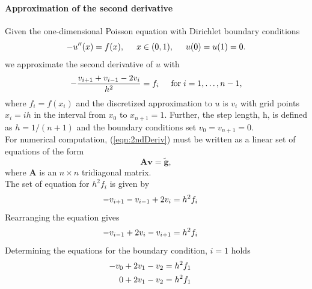 \documentclass[%
oneside,                 %
final,                   %
10pt]{article}
\begin{document}
\paragraph{Approximation of the second derivative}
Given the one-dimensional Poisson equation with Dirichlet boundary conditions
\begin{equation*}
-u''(x) = f(x), \hspace{0.5cm} x\in(0,1), \hspace{0.5cm} u(0) = u(1) = 0.
\end{equation*}
we approximate the second derivative of $u$ with
\begin{equation}\label{eqn:2ndDeriv}
   -\frac{v_{i+1}+v_{i-1}-2v_i}{h^2} = f_i  \hspace{0.5cm} \mathrm{for} \hspace{0.1cm} i=1,\dots, n-1,
\end{equation}
where $f_i=f(x_i)$ and the discretized approximation to $u$ is $v_i$ with grid points $x_i = ih$ in the interval from $x_0$ to $x_{n+1}=1$.
Further, the step length, h,  is defined as $h=1/(n+1)$ and the boundary conditions set $v_0 = v_{n+1}=0$. \\
For numerical computation, (\ref{eqn:2ndDeriv}) must be written as a linear set of equations of the form
\begin{equation*}
   \mathbf{A}\mathbf{v} = \tilde{\mathbf{g}},
\end{equation*}
where $\mathbf{A}$ is an $n\times n$  tridiagonal matrix.\\
The set of equation for $h^2f_i$ is given by
\begin{equation*}
   -v_{i+1}-v_{i-1}+2v_i = h^2f_i  \hspace{0.5cm} 
\end{equation*}
Rearranging the equation gives
\begin{equation}
  -v_{i-1}+2v_i - v_{i+1}= h^2f_i  \hspace{0.5cm} 
\end{equation}
Determining the equations for the boundary condition, $i=1$ holds 
\begin{equation}
\begin{aligned}
  -v_{0}+2v_1 - v_{2}&= h^2f_1  \hspace{0.5cm} \\
  0 + 2v_1 - v_{2}&= h^2f_1  \hspace{0.5cm} 
\end{aligned}
\end{equation}
\end{document}
